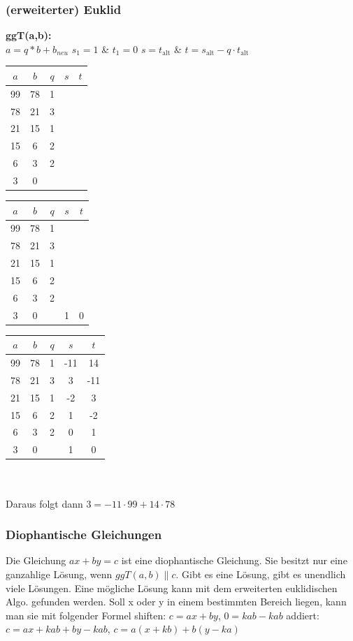 \documentclass[10pt]{article}
\newcommand{\T}[1]{\text{#1}} %
\begin{document}
\subsubsection{(erweiterter) Euklid}
\textbf{ggT(a,b):} \\
$a=q*b+b_{neu}$ \hspace*{1cm} $s_1=1$ \& $t_1=0$ \hspace*{0.75cm} $s=t_{\T{alt}}$ \& $t=s_{\T{alt}}-q\cdot t_{\T{alt}}$\\
\begin{tabular}{| c | c | c | c | c |}
   \hline
   $a$ & $b$ & $q$ & $s$ & $t$ \\
   \hline
   99 & 78 & 1 &  & \\
   78 & 21 & 3 &  & \\
   21 & 15 & 1 &  & \\
   15 & 6 & 2 &  & \\
   6 & 3 & 2 &  & \\
   3 & 0 &  &  & \\\hline
\end{tabular}
\begin{tabular}{| c | c | c | c | c |}
   \hline
   $a$ & $b$ & $q$ & $s$ & $t$ \\
   \hline
   99 & 78 & 1 &  & \\
   78 & 21 & 3 &  & \\
   21 & 15 & 1 &  & \\
   15 & 6 & 2 &  & \\
   6 & 3 & 2 &  & \\
   3 & 0 &  & 1 & 0 \\\hline
\end{tabular}
\begin{tabular}{| c | c | c | c | c |}
   \hline
   $a$ & $b$ & $q$ & $s$ & $t$ \\
   \hline
   99 & 78 & 1 & -11 & 14\\
   78 & 21 & 3 & 3 & -11\\
   21 & 15 & 1 & -2 & 3\\
   15 & 6 & 2 & 1 & -2\\
   6 & 3 & 2 & 0 & 1\\
   3 & 0 &  & 1 & 0 \\\hline
\end{tabular}\\
\\
Daraus folgt dann $3=-11\cdot99+14\cdot78$
\subsubsection{Diophantische Gleichungen}
Die Gleichung $ax + by = c$ ist eine diophantische Gleichung. Sie besitzt nur eine ganzahlige Lösung, wenn $ggT(a, b)\|c$. Gibt es eine Lösung, gibt es unendlich viele Lösungen. Eine mögliche Lösung kann mit dem erweiterten euklidischen Algo. gefunden werden. Soll x oder y in einem bestimmten Bereich liegen, kann man sie mit folgender Formel shiften: $c = ax + by$, $0 = kab - kab$ addiert: $c = ax + kab + by - kab$, $c = a(x + kb) + b(y - ka)$
\end{document}
